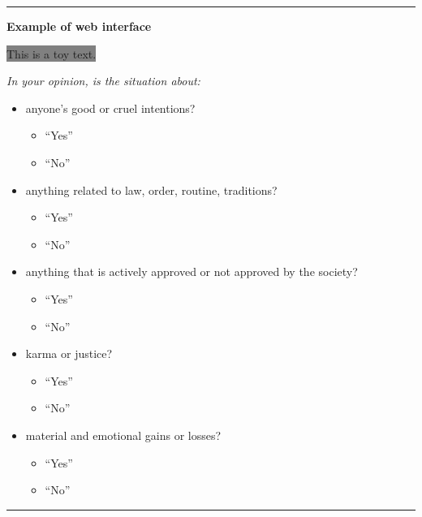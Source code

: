 \documentclass[11pt]{article}
\makeatletter
\newcommand*{\radiobutton}{\@ifstar{\@radiobutton0}{\@radiobutton1}}
\newcommand*{\@radiobutton}[1]{\begin{tikzpicture}
    \pgfmathsetlengthmacro\radius{height("X")/3}
    \draw[radius=\radius] circle;
    \ifcase#1 \fill[radius=.6*\radius] circle;\fi
  \end{tikzpicture}}
\makeatother
\begin{document}
\begin{table*}[t!]
\begin{minipage}[t]{.43\linewidth}
\par\noindent\rule{\textwidth}{0.8pt}

\vspace{0.05cm}
\textbf{Example of web interface}
\vspace{0.1cm}

\colorbox{Gray}{This is a toy text.}


\vspace{0.05cm}
\noindent \textit{In your opinion, is the situation about:}

\begin{itemize}[noitemsep,topsep=0.1pt]
            \item anyone's good or cruel intentions?
            \begin{itemize}[topsep=0.1pt,noitemsep]
                \item[\radiobutton] ``Yes''
                \item[\radiobutton] ``No''
            \end{itemize}
            \item anything related to law, order, routine, traditions?
            \begin{itemize}[topsep=0.1pt,noitemsep]
                \item[\radiobutton] ``Yes''
                \item[\radiobutton] ``No''
            \end{itemize}
            \item anything that is actively approved or not approved by the society?
            \begin{itemize}[topsep=0.1pt,noitemsep]
                \item[\radiobutton] ``Yes''
                \item[\radiobutton] ``No''
            \end{itemize}
            \item karma or justice?
            \begin{itemize}[topsep=0.1pt,noitemsep]
                \item[\radiobutton] ``Yes''
                \item[\radiobutton] ``No''
            \end{itemize}
            \item material and emotional gains or losses?
            \begin{itemize}[topsep=0.1pt,noitemsep]
                \item[\radiobutton] ``Yes''
                \item[\radiobutton] ``No''
            \end{itemize}
        \end{itemize}
\par\noindent\rule{\textwidth}{1pt}


\end{minipage}
\end{table*}
\end{document}
